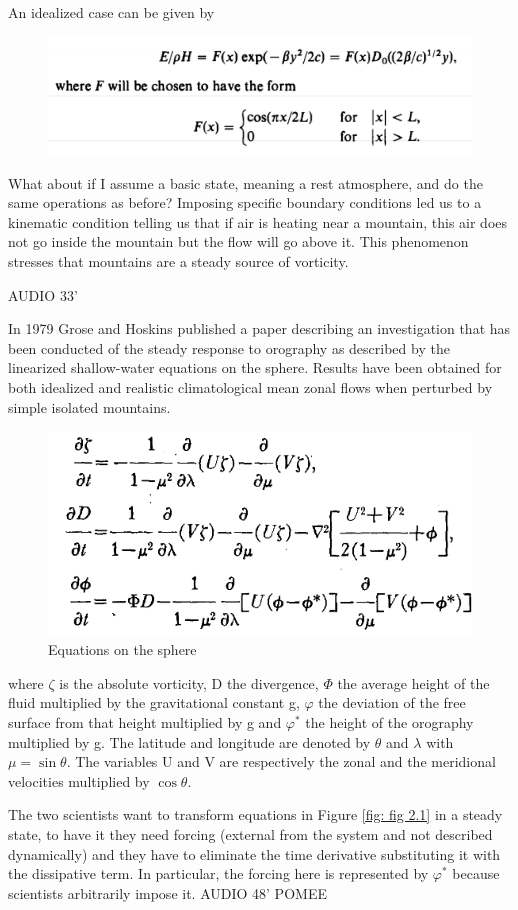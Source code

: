 An idealized case can be given by
\begin{figure}[htp!]
	\centering
	\includegraphics[width=0.5\linewidth]{uploads/22image.png}
	\label{fig:enter-label}
\end{figure}

What about if I assume a basic state, meaning a rest atmosphere, and do the same operations as before? Imposing specific boundary conditions led us to a kinematic condition telling us that if air is heating near a mountain, this air does not go inside the mountain but the flow will go above it. This phenomenon stresses that mountains are a steady source of vorticity.

AUDIO 33'

In 1979 Grose and Hoskins published a paper describing an investigation that has been conducted of the steady response to orography as described by the linearized shallow-water equations on the sphere.
Results have been obtained for both idealized and realistic climatological mean zonal flows when perturbed by simple isolated mountains.

\begin{figure}[htp!]
	\centering
	\includegraphics[width=0.5\linewidth]{uploads/19image.png}
	\caption{Equations on the sphere}
	\label{fig: fig 2.2}

\end{figure}
where $\zeta$ is the absolute vorticity, D the divergence, $\Phi$
the average height of the fluid multiplied by the gravitational constant g, $\varphi$ the deviation of the free surface from that height multiplied by g and $\varphi^*$ the height of the orography multiplied by g. The latitude and longitude are denoted by $\theta$ and $\lambda$ with $\mu = \sin \theta$. The variables U and V are respectively the zonal and the meridional velocities multiplied by $\cos \theta$.


The two scientists want to transform equations in Figure \ref{fig: fig 2.1} in a steady state, to have it they need forcing (external from the system and not described dynamically) and they have to eliminate the time derivative substituting it with the dissipative term.
In particular, the forcing here is represented by $\varphi^*$ because scientists arbitrarily impose it.
AUDIO 48' POMEE




